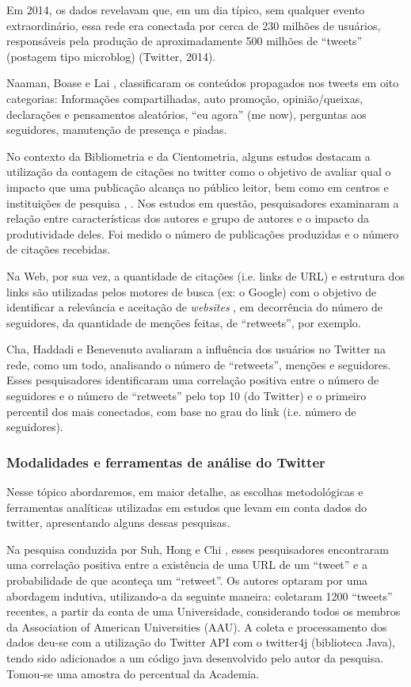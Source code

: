 Em 2014, os dados revelavam que, em um dia típico, sem qualquer evento extraordinário, essa rede era conectada por cerca de 230 milhões de usuários, responsáveis pela produção de aproximadamente 500 milhões de ``tweets'' (postagem tipo microblog) (Twitter, 2014).

Naaman, Boase e Lai \cite{naaman2010really}, classificaram os   conteúdos propagados nos tweets em oito categorias: Informações compartilhadas, auto promoção, opinião/queixas, declarações e pensamentos aleatórios, ``eu agora'' (me now), perguntas aos seguidores, manutenção de presença e piadas. 

No contexto da Bibliometria e da Cientometria, alguns estudos destacam a utilização da contagem de citações no twitter como o objetivo  de avaliar qual o impacto que uma publicação alcança no público leitor, bem como em centros e instituições de pesquisa \cite{adkins2006scholarly}, \cite{cunningham1997authorship}. Nos estudos em questão, pesquisadores examinaram a relação entre características dos autores e grupo de autores e o impacto da produtividade deles. Foi medido o número de publicações produzidas e o número de citações recebidas. 

Na Web, por sua vez, a quantidade de citações (i.e. links de URL) e estrutura dos links são utilizadas pelos motores de busca (ex: o Google) com o objetivo de identificar a relevância e aceitação de \textit{websites} \cite{brin1998anatomy}, em decorrência do número de seguidores, da quantidade de menções feitas, de ``retweets'', por exemplo.

Cha, Haddadi e Benevenuto \cite{cha2010measuring} avaliaram a influência dos usuários no Twitter na rede, como um todo, analisando o número de ``retweets'', menções e seguidores. Esses pesquisadores identificaram uma correlação positiva entre o número de seguidores e o número de ``retweets'' pelo top 10 (do Twitter) e o primeiro percentil dos mais conectados, com base no grau do link (i.e. número de seguidores). 


\subsubsection{Modalidades e ferramentas de análise do Twitter} 

Nesse tópico abordaremos, em maior detalhe, as escolhas metodológicas e ferramentas analíticas utilizadas em estudos que levam em conta dados do twitter, apresentando alguns dessas pesquisas.

Na pesquisa conduzida por Suh, Hong e Chi \cite{suh2010want}, esses pesquisadores encontraram uma correlação positiva entre a existência de uma URL de um ``tweet'' e a probabilidade de que aconteça um ``retweet''. Os autores optaram por uma abordagem indutiva, utilizando-a da seguinte maneira: coletaram 1200 ``tweets'' recentes, a partir da conta de uma Universidade, considerando todos os membros da Association of American Universities (AAU). A coleta e processamento dos dados deu-se com a utilização do Twitter API com o twitter4j (biblioteca Java), tendo sido adicionados a um código java desenvolvido pelo autor da pesquisa. Tomou-se uma amostra do percentual da Academia. 

